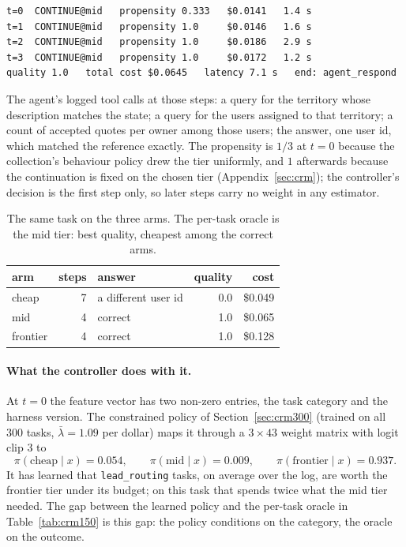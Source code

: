 \documentclass[10pt]{article}
\newcommand{\code}[1]{\texttt{#1}}
\begin{document}
{\small\begin{verbatim}
t=0  CONTINUE@mid   propensity 0.333   $0.0141   1.4 s
t=1  CONTINUE@mid   propensity 1.0     $0.0146   1.6 s
t=2  CONTINUE@mid   propensity 1.0     $0.0186   2.9 s
t=3  CONTINUE@mid   propensity 1.0     $0.0172   1.2 s
quality 1.0   total cost $0.0645   latency 7.1 s   end: agent_respond
\end{verbatim}}

\noindent The agent's logged tool calls at those steps: a query for the territory whose description matches the state; a query for the users assigned to that territory; a count of accepted quotes per owner among those users; the answer, one user id, which matched the reference exactly. The propensity is $1/3$ at $t=0$ because the collection's behaviour policy drew the tier uniformly, and $1$ afterwards because the continuation is fixed on the chosen tier (Appendix~\ref{sec:crm}); the controller's decision is the first step only, so later steps carry no weight in any estimator.

\begin{table}[H]\centering\small
\begin{tabular}{lrlrr}\toprule
arm & steps & answer & quality & cost \\\midrule
cheap & 7 & a different user id & 0.0 & \$0.049 \\
mid & 4 & correct & 1.0 & \$0.065 \\
frontier & 4 & correct & 1.0 & \$0.128 \\\bottomrule
\end{tabular}
\caption{The same task on the three arms. The per-task oracle is the mid tier: best quality, cheapest among the correct arms.}
\end{table}

\paragraph{What the controller does with it.} At $t=0$ the feature vector has two non-zero entries, the task category and the harness version. The constrained policy of Section~\ref{sec:crm300} (trained on all 300 tasks, $\bar\lambda=1.09$ per dollar) maps it through a $3\times43$ weight matrix with logit clip $3$ to
\[
\pi(\text{cheap}\mid x)=0.054,\qquad \pi(\text{mid}\mid x)=0.009,\qquad \pi(\text{frontier}\mid x)=0.937 .
\]
It has learned that \code{lead\_routing} tasks, on average over the log, are worth the frontier tier under its budget; on this task that spends twice what the mid tier needed. The gap between the learned policy and the per-task oracle in Table~\ref{tab:crm150} is this gap: the policy conditions on the category, the oracle on the outcome.
\end{document}
